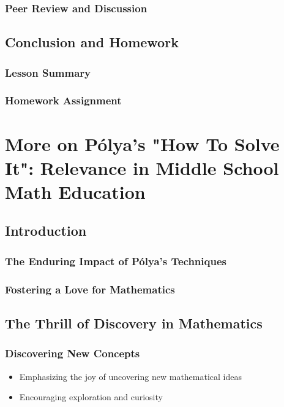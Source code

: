 \documentclass{book}
\begin{document}
\subsection{Peer Review and Discussion}


\section{Conclusion and Homework}
\subsection{Lesson Summary}
\subsection{Homework Assignment}


\chapter{More on Pólya's "How To Solve It": Relevance in Middle School Math Education}


\section{Introduction}
\subsection{The Enduring Impact of Pólya's Techniques}
\subsection{Fostering a Love for Mathematics}


\section{The Thrill of Discovery in Mathematics}
\subsection{Discovering New Concepts}
\begin{itemize}
        \item Emphasizing the joy of uncovering new mathematical ideas
        \item Encouraging exploration and curiosity
\end{itemize}
\end{document}
